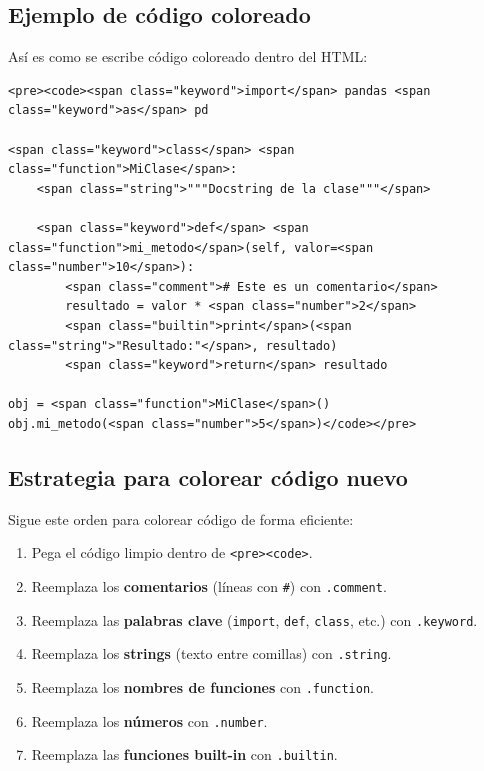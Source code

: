 \documentclass[12pt, a4paper]{article}
\newcommand{\clase}[1]{\texttt{\textcolor{cpAzul}{.#1}}}
\newcommand{\etiquetaHtml}[1]{\texttt{\textcolor{cpKeyword}{<#1>}}}
\begin{document}
\subsection{Ejemplo de código coloreado}

Así es como se escribe código coloreado dentro del HTML:

\begin{lstlisting}[style=htmlstyle, caption={Ejemplo: función Python con colores}]
<pre><code><span class="keyword">import</span> pandas <span class="keyword">as</span> pd

<span class="keyword">class</span> <span class="function">MiClase</span>:
    <span class="string">"""Docstring de la clase"""</span>

    <span class="keyword">def</span> <span class="function">mi_metodo</span>(self, valor=<span class="number">10</span>):
        <span class="comment"># Este es un comentario</span>
        resultado = valor * <span class="number">2</span>
        <span class="builtin">print</span>(<span class="string">"Resultado:"</span>, resultado)
        <span class="keyword">return</span> resultado

obj = <span class="function">MiClase</span>()
obj.mi_metodo(<span class="number">5</span>)</code></pre>
\end{lstlisting}

\subsection{Estrategia para colorear código nuevo}

Sigue este orden para colorear código de forma eficiente:

\begin{enumerate}[leftmargin=1.5em]
    \item Pega el código limpio dentro de \etiquetaHtml{pre}\etiquetaHtml{code}.
    \item Reemplaza los \textbf{comentarios} (líneas con \texttt{\#}) con \clase{comment}.
    \item Reemplaza las \textbf{palabras clave} (\texttt{import}, \texttt{def}, \texttt{class}, etc.) con \clase{keyword}.
    \item Reemplaza los \textbf{strings} (texto entre comillas) con \clase{string}.
    \item Reemplaza los \textbf{nombres de funciones} con \clase{function}.
    \item Reemplaza los \textbf{números} con \clase{number}.
    \item Reemplaza las \textbf{funciones built-in} con \clase{builtin}.
\end{enumerate}
\end{document}
